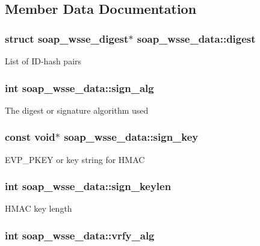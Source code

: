 \subsection{Member Data Documentation}
\hypertarget{structsoap__wsse__data_a2f87a84ed57ff262fad7501f4cc27625}{
\subsubsection[{digest}]{\setlength{\rightskip}{0pt plus 5cm}struct {\bf soap\_\-wsse\_\-digest}$\ast$ {\bf soap\_\-wsse\_\-data::digest}}}
\label{structsoap__wsse__data_a2f87a84ed57ff262fad7501f4cc27625}
List of ID-\/hash pairs \hypertarget{structsoap__wsse__data_ab80ddb3bc30b87b29c746e4408d8cca2}{
\subsubsection[{sign\_\-alg}]{\setlength{\rightskip}{0pt plus 5cm}int {\bf soap\_\-wsse\_\-data::sign\_\-alg}}}
\label{structsoap__wsse__data_ab80ddb3bc30b87b29c746e4408d8cca2}
The digest or signature algorithm used \hypertarget{structsoap__wsse__data_a92d1d29c172b8194691fbe73b83e6b38}{
\subsubsection[{sign\_\-key}]{\setlength{\rightskip}{0pt plus 5cm}const void$\ast$ {\bf soap\_\-wsse\_\-data::sign\_\-key}}}
\label{structsoap__wsse__data_a92d1d29c172b8194691fbe73b83e6b38}
EVP\_\-PKEY or key string for HMAC \hypertarget{structsoap__wsse__data_afc850594dea904592802775184228cea}{
\subsubsection[{sign\_\-keylen}]{\setlength{\rightskip}{0pt plus 5cm}int {\bf soap\_\-wsse\_\-data::sign\_\-keylen}}}
\label{structsoap__wsse__data_afc850594dea904592802775184228cea}
HMAC key length \hypertarget{structsoap__wsse__data_a0d9a91454240aedf7f709e890719c3f2}{
\subsubsection[{vrfy\_\-alg}]{\setlength{\rightskip}{0pt plus 5cm}int {\bf soap\_\-wsse\_\-data::vrfy\_\-alg}}}
